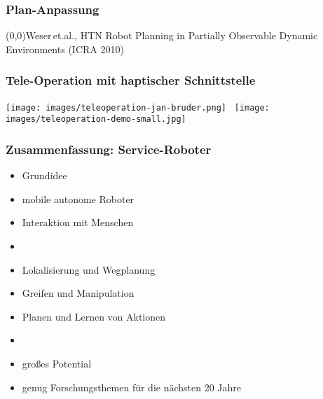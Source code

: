 \documentclass[t]{beamer}
\def\quelle#1{{\tiny \makebox(0,0){}\vfill\hfill #1}}
\def\ii{\item[]}
\begin{document}
\begin{frame}
\frametitle{Plan-Anpassung}
%
%
\strut
\vspace*{50mm}
\quelle{Weser\,et.al., 
HTN Robot Planning in Partially Observable Dynamic Environments (ICRA 2010)}
\end{frame}


\begin{frame}
\frametitle{Tele-Operation mit haptischer Schnittstelle}
\texttt{[image: images/teleoperation-jan-bruder.png]}~
\texttt{[image: images/teleoperation-demo-small.jpg]}
\end{frame}


%




\begin{frame}
\frametitle{Zusammenfassung: Service-Roboter}
\begin{itemize}
\item Grundidee
\item mobile autonome Roboter
\item Interaktion mit Menschen
\ii
\item Lokalisierung und Wegplanung
\item Greifen und Manipulation
\item Planen und Lernen von Aktionen 
\ii

\item großes Potential
\item genug Forschungsthemen für die nächsten 20 Jahre
\end{itemize}
\end{frame}
\end{document}
